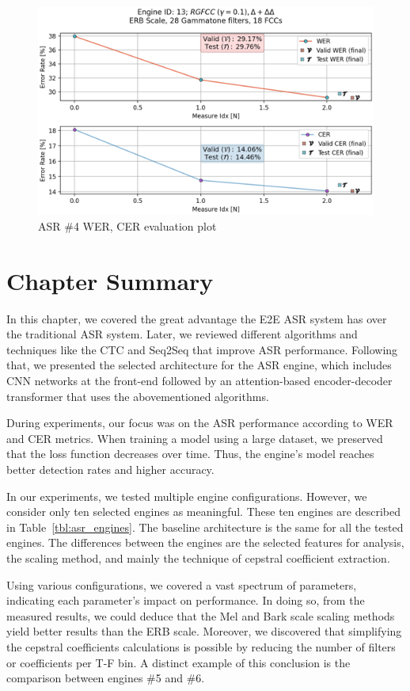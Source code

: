 \begin{figure}[H]
    \centering
    \includegraphics[width=0.95\linewidth]{ASR/images/asr13_wer.png}
    \caption{ASR \#4 WER, CER evaluation plot}\label{fig:wer_13}
\end{figure}

\section{Chapter Summary}
In this chapter, we covered the great advantage 
the E2E ASR system has over the traditional ASR system. 
Later, we reviewed different algorithms 
and techniques like the CTC and Seq2Seq 
that improve ASR performance. 
Following that, we presented the selected 
architecture for the ASR engine, 
which includes CNN networks at the front-end 
followed by an attention-based 
encoder-decoder transformer 
that uses the abovementioned algorithms.

During experiments, our focus was on the ASR 
performance according to WER and CER metrics.
When training a model using a large dataset, 
we preserved that the loss function decreases over time. 
Thus, the engine's model reaches better 
detection rates and higher accuracy.

In our experiments, we tested multiple engine configurations. 
However, we consider only ten selected engines as meaningful. 
These ten engines are described in Table~\ref{tbl:asr_engines}.
The baseline architecture is the same for all the tested engines. 
The differences between the engines are the selected features for analysis, 
the scaling method, 
and mainly the technique of cepstral coefficient extraction.

Using various configurations, we covered a vast spectrum of parameters, 
indicating each parameter's impact on performance.
In doing so, from the measured results, 
we could deduce that the Mel and Bark scale scaling methods 
yield better results than the ERB scale. 
Moreover, we discovered that simplifying the cepstral coefficients
calculations is possible by reducing the 
number of filters or coefficients per T-F bin.
A distinct example of this conclusion 
is the comparison between engines \#5 and \#6.

